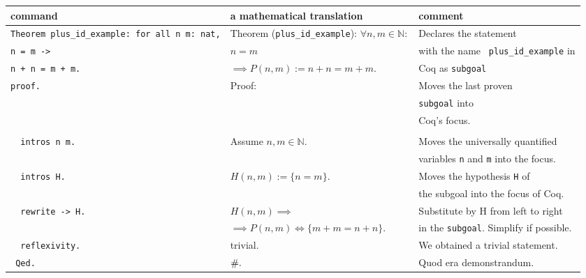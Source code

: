 	     \begin{center}
	     \begin{tabular} {|l|l|l|}
	     	\hline
	     	 command                        & a mathematical translation          & comment  \\  \hline
	     	 \lstinline!Theorem plus_id_example: for all n m: nat,!
	     	                                 & Theorem (\verb!plus_id_example!): $\forall n,m \in \mathbb{N}:$
	     	                                                                       & Declares the statement \\ 
	         \lstinline!n = m ->!            & $n=m$                               & with the name \lstinline! plus_id_example! in \\ 
		     \lstinline!n + n = m + m.!      & $\implies P(n,m) := n+n = m+m.$     & Coq as \lstinline!subgoal! \\  \hline
	     	 \lstinline!proof.!              & Proof:                       & Moves the last proven \\   
	     	      	                         &                                     & \lstinline!subgoal! into  \\     
	     	      	                         &                                     & Coq's focus.\\  
	       	                                 &                                     &                                     \\   \hline
	         \lstinline!  intros n m.!       & Assume $n,m \in \mathbb{N}.$        & Moves the universally quantified     \\
	                                         &                                     & variables \lstinline!n! and \lstinline!m! into the focus.    \\   \hline                                            
	         \lstinline!  intros H.!         & $H(n,m) :=\{n=m\}.$                 & Moves the hypothesis \lstinline!H! of\\ 
	    	                                     &                                     & the subgoal into the focus of Coq.   \\ \hline   
	     	 \lstinline!  rewrite -> H.!     & $H(n,m)\implies $                   & Substitute by H from left to right  \\  
	     	                                 & $\implies P(n,m)\Leftrightarrow\{m+m = n+n\}.$
	     	                                      	                              &  in the \lstinline!subgoal!. Simplify if possible. \\ \hline
	     	 \lstinline!  reflexivity.!      & trivial.                             &  We obtained a trivial statement.                  \\ \hline
	    	     \lstinline! Qed.!               & $\qed.$                                &  Quod era demonstrandum.                           \\  \hline
	    	 
	     \end{tabular}
	     \end{center}         
